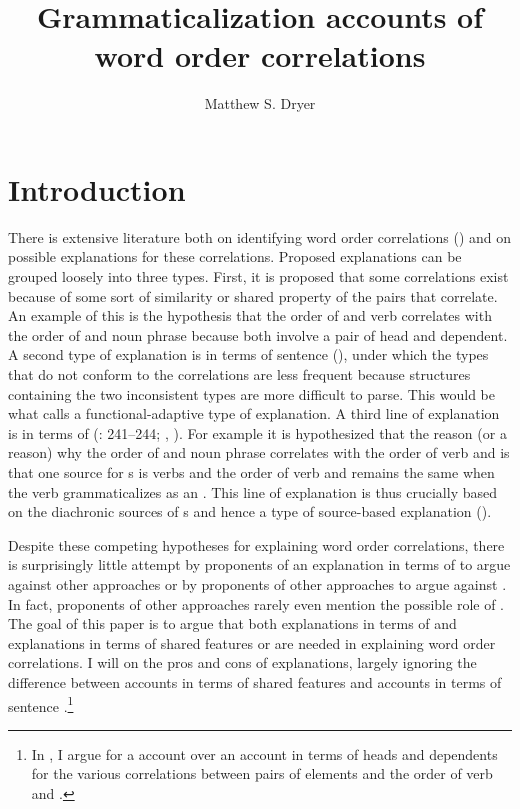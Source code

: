 \documentclass[output=paper]{langsci/langscibook}
\author{Matthew S. Dryer\affiliation{University at Buffalo}}
\title{Grammaticalization accounts of word order correlations}
\begin{document}
\maketitle 

\section{Introduction}

There is extensive literature both on identifying word order correlations (\citealt{Greenberg1963,Hawkins1983,Dryer1992}) and on possible explanations for these correlations. Proposed explanations can be grouped loosely into three types. First, it is proposed that some correlations exist because of some sort of similarity or shared property of the pairs that correlate. An example of this is the hypothesis that the order of  and verb correlates with the order of  and noun phrase because both involve a pair of head and dependent. A second type of explanation is in terms of sentence  (\citealt{Kuno1974,Dryer1992,Dryer2009_Corr,Hawkins1994_Perf,Hawkins2004_Eff,Hawkins2014_VarEff}), under which the types that do not conform to the correlations are less frequent because structures containing the two inconsistent types are more difficult to parse. This would be what  calls a functional-adaptive type of explanation. A third line of explanation is in terms of  (\citealt{Givón1979,HeineReh1984}: 241–244; \citealt{Bybee1988,Aristar1991,DeLancey1994,Collins2012}, ). For example it is hypothesized that the reason (or a reason) why the order of  and noun phrase correlates with the order of verb and  is that one  source for s is verbs and the order of verb and  remains the same when the verb grammaticalizes as an . This line of explanation is thus crucially based on the diachronic sources of s and hence a type of source-based explanation ().

Despite these competing hypotheses for explaining word order correlations, there is surprisingly little attempt by proponents of an explanation in terms of  to argue against other approaches or by proponents of other approaches to argue against . In fact, proponents of other approaches rarely even mention the possible role of . The goal of this paper is to argue that both explanations in terms of  and explanations in terms of shared features or  are needed in explaining word order correlations. I will  on the pros and cons of  explanations, largely ignoring the difference between accounts in terms of shared features and accounts in terms of sentence .\footnote{In \citet{Dryer1992}, I argue for a  account over an account in terms of heads and dependents for the various correlations between pairs of elements and the order of verb and .}
\end{document}
